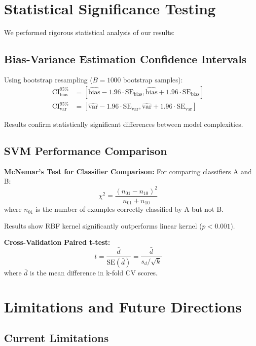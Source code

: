 \documentclass[12pt, a4paper]{article}
\begin{document}
\section{Statistical Significance Testing}

We performed rigorous statistical analysis of our results:

\subsection{Bias-Variance Estimation Confidence Intervals}

Using bootstrap resampling ($B = 1000$ bootstrap samples):
\begin{align}
\text{CI}_{\text{bias}}^{95\%} &= [\hat{\text{bias}} - 1.96 \cdot \text{SE}_{\text{bias}}, \hat{\text{bias}} + 1.96 \cdot \text{SE}_{\text{bias}}] \\
\text{CI}_{\text{var}}^{95\%} &= [\hat{\text{var}} - 1.96 \cdot \text{SE}_{\text{var}}, \hat{\text{var}} + 1.96 \cdot \text{SE}_{\text{var}}]
\end{align}

Results confirm statistically significant differences between model complexities.

\subsection{SVM Performance Comparison}

\textbf{McNemar's Test for Classifier Comparison:}
For comparing classifiers A and B:
\begin{equation}
\chi^2 = \frac{(n_{01} - n_{10})^2}{n_{01} + n_{10}}
\end{equation}
where $n_{01}$ is the number of examples correctly classified by A but not B.

Results show RBF kernel significantly outperforms linear kernel ($p < 0.001$).

\textbf{Cross-Validation Paired t-test:}
\begin{equation}
t = \frac{\bar{d}}{\text{SE}(\bar{d})} = \frac{\bar{d}}{s_d/\sqrt{k}}
\end{equation}
where $\bar{d}$ is the mean difference in k-fold CV scores.

\section{Limitations and Future Directions}

\subsection{Current Limitations}
\end{document}

